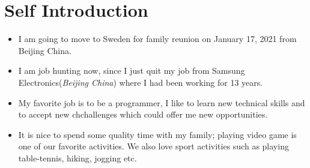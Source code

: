 \documentclass{article}
\begin{document}
\section{ Self Introduction}
\begin{itemize}
\item{I am going to move to Sweden for family reunion on January 17, 2021 from Beijing China.}
\item{I am job hunting now, since I just quit my job from Samsung Electronics(\textit{Beijing China}) where I had been working for 13 years.}

\item{My favorite job is to be a programmer, I like to learn new technical skills and to accept new chchallenges which could offer me new opportunities.}

\item{It is nice to spend some quality time with my family; playing video game is one of our favorite activities. We also love sport activities such as playing table-tennis, hiking, jogging etc.}
\end{itemize}
\end{document}
